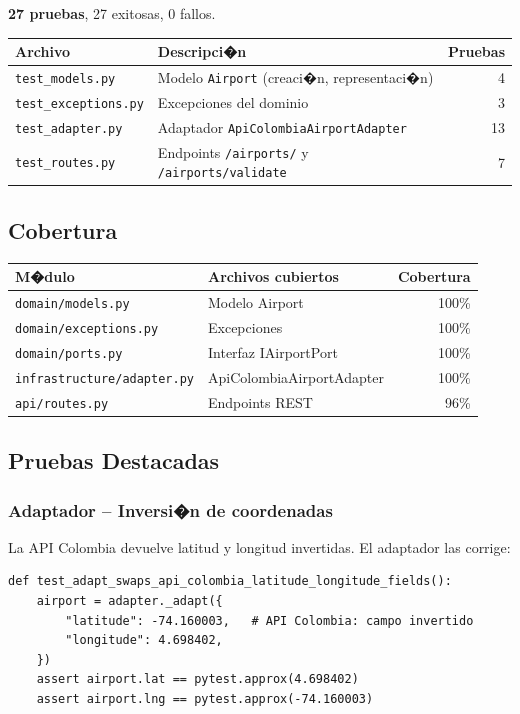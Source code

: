 \documentclass[12pt,a4paper]{article}
\begin{document}
\textbf{27 pruebas}, 27 exitosas, 0 fallos.

\vspace{0.3cm}
\begin{tabularx}{\textwidth}{lXr}
  \toprule
  \textbf{Archivo} & \textbf{Descripci�n} & \textbf{Pruebas} \\
  \midrule
  \texttt{test\_models.py} & Modelo \texttt{Airport} (creaci�n, representaci�n) & 4 \\
  \texttt{test\_exceptions.py} & Excepciones del dominio & 3 \\
  \texttt{test\_adapter.py} & Adaptador \texttt{ApiColombiaAirportAdapter} & 13 \\
  \texttt{test\_routes.py} & Endpoints \texttt{/airports/} y \texttt{/airports/validate} & 7 \\
  \bottomrule
\end{tabularx}

\subsection{Cobertura}

\begin{tabularx}{\textwidth}{lXr}
  \toprule
  \textbf{M�dulo} & \textbf{Archivos cubiertos} & \textbf{Cobertura} \\
  \midrule
  \texttt{domain/models.py} & Modelo Airport & 100\% \\
  \texttt{domain/exceptions.py} & Excepciones & 100\% \\
  \texttt{domain/ports.py} & Interfaz IAirportPort & 100\% \\
  \texttt{infrastructure/adapter.py} & ApiColombiaAirportAdapter & 100\% \\
  \texttt{api/routes.py} & Endpoints REST & 96\% \\
  \bottomrule
\end{tabularx}

\subsection{Pruebas Destacadas}

\subsubsection{Adaptador -- Inversi�n de coordenadas}
La API Colombia devuelve latitud y longitud invertidas. El adaptador las corrige:

\vspace{0.3cm}
\begin{lstlisting}[style=pythonstyle]
def test_adapt_swaps_api_colombia_latitude_longitude_fields():
    airport = adapter._adapt({
        "latitude": -74.160003,   # API Colombia: campo invertido
        "longitude": 4.698402,
    })
    assert airport.lat == pytest.approx(4.698402)
    assert airport.lng == pytest.approx(-74.160003)
\end{lstlisting}
\end{document}
